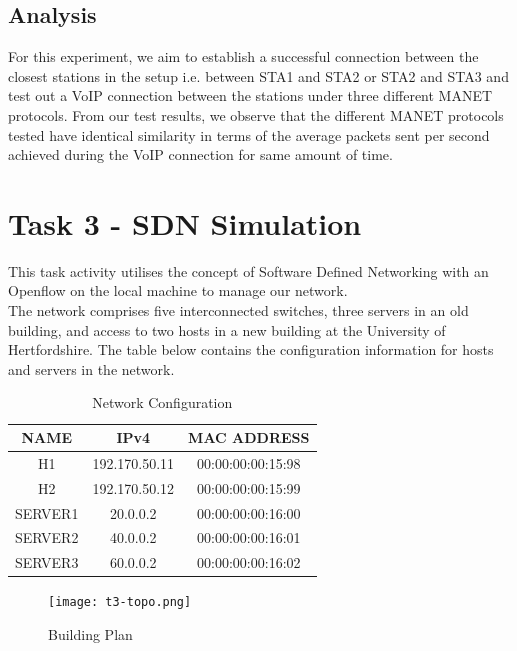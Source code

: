 \documentclass{article}
\begin{document}
\newpage
\subsection{Analysis}
For this experiment, we aim to establish a successful connection between the closest stations in the setup i.e. between STA1 and STA2 or STA2 and STA3 and test out a VoIP connection between the stations under three different MANET protocols. From our test results, we observe that the different MANET protocols tested have identical similarity in terms of the average packets sent per second achieved during the VoIP connection for same amount of time.

\newpage
\section{Task 3 - SDN Simulation}
This task activity utilises the concept of Software Defined Networking with an Openflow on the local machine to manage our network. \\The network comprises five interconnected switches, three servers in an old building, and access to two hosts in a new building at the University of Hertfordshire. The table below contains the configuration information for hosts and servers in the network.
    	\begin{table}[h]
        		\centering
        		\begin{tabular}{|c|c|c|}
            		\hline
            		NAME & IPv4 & MAC ADDRESS \\
            		\hline
            		H1 & 192.170.50.11 & 00:00:00:00:15:98 \\
           		H2 & 192.170.50.12 & 00:00:00:00:15:99 \\
            		SERVER1 & 20.0.0.2 & 00:00:00:00:16:00 \\
            		SERVER2 & 40.0.0.2 & 00:00:00:00:16:01 \\
            		SERVER3 & 60.0.0.2 & 00:00:00:00:16:02 \\
            		\hline
        		\end{tabular}
        		\caption{Network Configuration}
        		\label{tab:4}
    	\end{table}

    	\begin{figure}[h]
        		\centering
        		\texttt{[image: t3-topo.png]}
        		\caption{Building Plan}
        		\label{fig:t3-1}
    	\end{figure}
\end{document}

